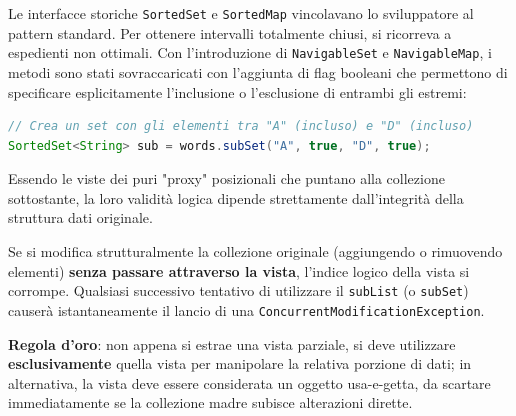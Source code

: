 \begin{observation}
Le interfacce storiche \texttt{SortedSet} e \texttt{SortedMap} vincolavano lo sviluppatore al pattern standard. Per ottenere intervalli totalmente chiusi, si ricorreva a espedienti non ottimali. 
Con l'introduzione di \texttt{NavigableSet} e \texttt{NavigableMap}, i metodi sono stati sovraccaricati con l'aggiunta di flag booleani che permettono di specificare esplicitamente l'inclusione o l'esclusione di entrambi gli estremi:
\begin{lstlisting}[language=Java]
// Crea un set con gli elementi tra "A" (incluso) e "D" (incluso)
SortedSet<String> sub = words.subSet("A", true, "D", true);
\end{lstlisting}
\end{observation}

\begin{danger}
Essendo le viste dei puri "proxy" posizionali che puntano alla collezione sottostante, la loro validità logica dipende strettamente dall'integrità della struttura dati originale.

Se si modifica strutturalmente la collezione originale (aggiungendo o rimuovendo elementi) \textbf{senza passare attraverso la vista}, l'indice logico della vista si corrompe. Qualsiasi successivo tentativo di utilizzare il \texttt{subList} (o \texttt{subSet}) causerà istantaneamente il lancio di una \texttt{ConcurrentModificationException}. 

\textbf{Regola d'oro}: non appena si estrae una vista parziale, si deve utilizzare \textbf{esclusivamente} quella vista per manipolare la relativa porzione di dati; in alternativa, la vista deve essere considerata un oggetto usa-e-getta, da scartare immediatamente se la collezione madre subisce alterazioni dirette.
\end{danger}
